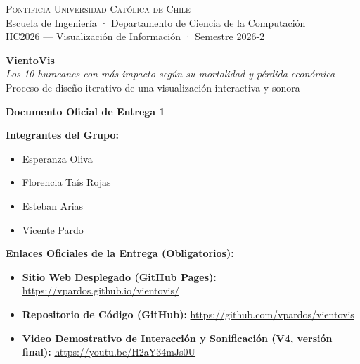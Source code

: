 \documentclass[11pt,a4paper]{article}
\begin{document}
	
	\begin{center}
		{\scshape\Large Pontificia Universidad Católica de Chile}\\[0.2cm]
		{\large Escuela de Ingeniería · Departamento de Ciencia de la Computación}\\[0.15cm]
		{\large IIC2026 — Visualización de Información · Semestre 2026-2}\\[0.8cm]
		
		\begin{tcolorbox}[colback=ink, colframe=ink, arc=6pt, halign=center, left=15pt, right=15pt, top=14pt, bottom=14pt]
			{\color{white}\Huge \textbf{VientoVis}}\\[0.25cm]
			{\color{ochre}\LARGE \textit{Los 10 huracanes con más impacto según su mortalidad y pérdida económica}}\\[0.2cm]
			{\color{softgray}\large Proceso de diseño iterativo de una visualización interactiva y sonora}
		\end{tcolorbox}
		\vspace{0.4cm}
		
		{\large \textbf{Documento Oficial de Entrega 1}}\\[0.4cm]
		
		\begin{metabox}
			\textbf{Integrantes del Grupo:}
			\begin{itemize}[leftmargin=1.2em]
				\item Esperanza Oliva
				\item Florencia Taís Rojas
				\item Esteban Arias
				\item Vicente Pardo
			\end{itemize}
			\vspace{0.25cm}
			\textbf{Enlaces Oficiales de la Entrega (Obligatorios):}
			\begin{itemize}[leftmargin=1.2em]
				\item \textbf{Sitio Web Desplegado (GitHub Pages):} \href{https://vpardos.github.io/vientovis/}{https://vpardos.github.io/vientovis/}
				\item \textbf{Repositorio de Código (GitHub):} \href{https://github.com/vpardos/vientovis}{https://github.com/vpardos/vientovis}
				\item \textbf{Video Demostrativo de Interacción y Sonificación (V4, versión final):} \href{https://youtu.be/H2aY34mJs0U}{https://youtu.be/H2aY34mJs0U}
			\end{itemize}
		\end{metabox}
	\end{center}
	
\end{document}
